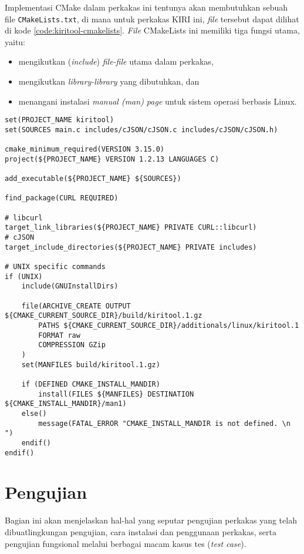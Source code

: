 Implementasi CMake dalam perkakas ini tentunya akan membutuhkan sebuah file \verb|CMakeLists.txt|, di mana untuk perkakas \cl KIRI ini, \textit{file} tersebut dapat dilihat di kode \ref{code:kiritool-cmakelists}. \textit{File} CMakeLists ini memiliki tiga fungsi utama, yaitu:

\begin{itemize}
	\item mengikutkan (\textit{include}) \textit{file-file} utama dalam perkakas,
	\item mengikutkan \textit{library-library} yang dibutuhkan, dan
	\item menangani instalasi \textit{manual (man) page} untuk sistem operasi berbasis Linux. 
\end{itemize}

\begin{lstlisting}[language={}, caption=Implementasi CMakeLists.txt, label=code:kiritool-cmakelists]
set(PROJECT_NAME kiritool)
set(SOURCES main.c includes/cJSON/cJSON.c includes/cJSON/cJSON.h)

cmake_minimum_required(VERSION 3.15.0)
project(${PROJECT_NAME} VERSION 1.2.13 LANGUAGES C)

add_executable(${PROJECT_NAME} ${SOURCES})

find_package(CURL REQUIRED)

# libcurl
target_link_libraries(${PROJECT_NAME} PRIVATE CURL::libcurl)
# cJSON
target_include_directories(${PROJECT_NAME} PRIVATE includes)

# UNIX specific commands
if (UNIX)
    include(GNUInstallDirs)

    file(ARCHIVE_CREATE OUTPUT ${CMAKE_CURRENT_SOURCE_DIR}/build/kiritool.1.gz
        PATHS ${CMAKE_CURRENT_SOURCE_DIR}/additionals/linux/kiritool.1
        FORMAT raw
        COMPRESSION GZip
    )
    set(MANFILES build/kiritool.1.gz)

    if (DEFINED CMAKE_INSTALL_MANDIR)
        install(FILES ${MANFILES} DESTINATION ${CMAKE_INSTALL_MANDIR}/man1)
    else()
        message(FATAL_ERROR "CMAKE_INSTALL_MANDIR is not defined. \n  ")
    endif()
endif()
\end{lstlisting}

\section{Pengujian}
\label{sec:testing-experiments}

Bagian ini akan menjelaskan hal-hal yang seputar pengujian perkakas yang telah dibuat\textemdash lingkungan pengujian, cara instalasi dan penggunaan perkakas, serta pengujian fungsional melalui berbagai macam kasus tes (\textit{test case}).


